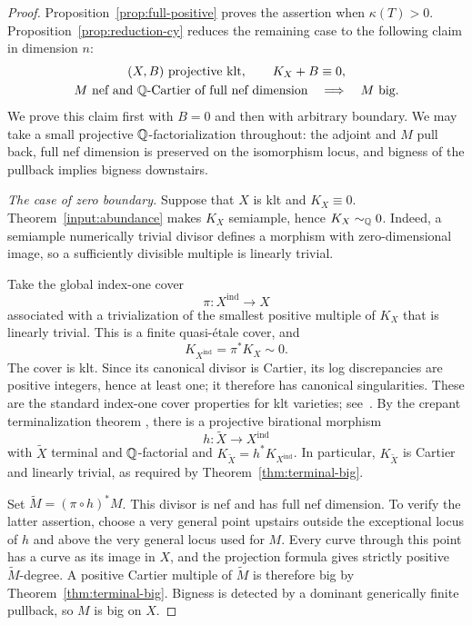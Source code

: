 \begin{proof}
Proposition~\ref{prop:full-positive} proves the assertion when
$\kappa(T)>0$.  Proposition~\ref{prop:reduction-cy} reduces the remaining
case to the following claim in dimension $n$:
\begin{equation}\label{eq:completion-cy-claim}
 \begin{gathered}
 (X,B)\text{ projective klt},\qquad K_X+B\equiv 0,\\
 M\text{ nef and $\mathbb Q$-Cartier of full nef dimension}
 \quad\Longrightarrow\quad M\text{ big}.
 \end{gathered}
\end{equation}
We prove this claim first with $B=0$ and then with arbitrary boundary.
We may take a small projective $\mathbb Q$-factorialization throughout: the
adjoint and $M$ pull back, full nef dimension is preserved on the
isomorphism locus, and bigness of the pullback implies bigness downstairs.

\medskip
\noindent\emph{The case of zero boundary.}
Suppose that $X$ is klt and $K_X\equiv0$.  Theorem~\ref{input:abundance}
makes $K_X$ semiample, hence $K_X\sim_{\mathbb Q}0$.  Indeed, a semiample
numerically trivial divisor defines a morphism with zero-dimensional
image, so a sufficiently divisible multiple is linearly trivial.

Take the global index-one cover
\[
  \pi\colon X^{\mathrm{ind}}\longrightarrow X
\]
associated with a trivialization of the smallest positive multiple of
$K_X$ that is linearly trivial.  This is a finite quasi-\'etale cover,
and
\[
  K_{X^{\mathrm{ind}}}=\pi^*K_X\sim0.
\]
The cover is klt.  Since its canonical divisor is Cartier, its log
discrepancies are positive integers, hence at least one; it therefore
has canonical singularities.
These are the standard index-one cover properties for klt varieties;
see~\cite[Definition~5.19 and Proposition~5.20]{KM}.
By the crepant terminalization theorem
\cite[Corollary~1.4.3]{BCHM}, there is a projective birational morphism
\[
  h\colon \widetilde X\longrightarrow X^{\mathrm{ind}}
\]
with $\widetilde X$ terminal and $\mathbb Q$-factorial and
$K_{\widetilde X}=h^*K_{X^{\mathrm{ind}}}$.
In particular, $K_{\widetilde X}$ is Cartier and linearly trivial, as
required by Theorem~\ref{thm:terminal-big}.

Set $\widetilde M=(\pi\circ h)^*M$.  This divisor is nef and has full
nef dimension.  To verify the latter assertion, choose a very general
point upstairs outside the exceptional locus of $h$ and above the
very general locus used for $M$.  Every curve through this point has
a curve as its image in $X$, and the projection formula gives strictly
positive $\widetilde M$-degree.  A positive Cartier multiple of
$\widetilde M$ is therefore big by Theorem~\ref{thm:terminal-big}.
Bigness is detected by a dominant generically finite pullback, so $M$
is big on $X$.


\end{proof}
